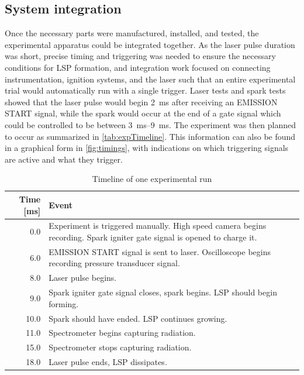         \subsection{System integration}
                Once the necessary parts were manufactured, installed, and tested, the experimental apparatus could be integrated together. As the laser pulse duration was short, precise timing and triggering was needed to ensure the necessary conditions for LSP formation, and integration work focused on connecting instrumentation, ignition systems, and the laser such that an entire experimental trial would automatically run with a single trigger. Laser tests and spark tests showed that the laser pulse would begin \qty{2}{ms} after receiving an EMISSION START signal, while the spark would occur at the end of a gate signal which could be controlled to be between \qtyrange{3}{9}{ms}. The experiment was then planned to occur as summarized in \autoref{tab:expTimeline}. This information can also be found in a graphical form in \autoref{fig:timings}, with indications on which triggering signals are active and what they trigger.

                \begin{table}[h]
                    \centering
                    \caption{Timeline of one experimental run}
                    \label{tab:expTimeline}
                    \begin{tabularx}{\textwidth}{rX}
                        \toprule
                        \textbf{Time [ms]}   & \textbf{Event} \\
                        \midrule
                        0.0         & Experiment is triggered manually. High speed camera begins recording. Spark igniter gate signal is opened to charge it. \\
                        6.0         & EMISSION START signal is sent to laser. Oscilloscope begins recording pressure transducer signal. \\
                        8.0         & Laser pulse begins.    \\
                        9.0         & Spark igniter gate signal closes, spark begins. LSP should begin forming. \\
                        10.0        & Spark should have ended. LSP continues growing.   \\
                        11.0        & Spectrometer begins capturing radiation.  \\
                        15.0        & Spectrometer stops capturing radiation.   \\
                        18.0        & Laser pulse ends, LSP dissipates. \\
                        \bottomrule
                    \end{tabularx}
                \end{table}
                
